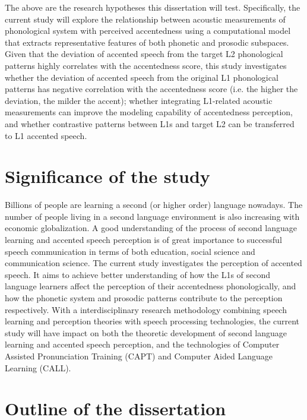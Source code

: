 The above are the research hypotheses this dissertation will test. Specifically, the current study will explore the relationship between acoustic measurements of phonological system with perceived accentedness using a computational model that extracts representative features of both phonetic and prosodic subspaces. Given that the deviation of accented speech from the target L2 phonological patterns highly correlates with the accentedness score, this study investigates whether the deviation of accented speech from the original L1 phonological patterns has negative correlation with the accentedness score (i.e. the higher the deviation, the milder the accent); whether integrating L1-related acoustic measurements can improve the modeling capability of accentedness perception, and whether contrastive patterns between L1s and target L2 can be transferred to L1 accented speech.

\section{Significance of the study}

Billions of people are learning a second (or higher order) language nowadays. The number of people living in a second language environment is also increasing with economic globalization. A good understanding of the process of second language learning and accented speech perception is of great importance to successful speech communication in terms of both education, social science and communication science. The current study investigates the perception of accented speech. It aims to achieve better understanding of how the L1s of second language learners affect the perception of their accentedness phonologically, and how the phonetic system and prosodic patterns contribute to the perception respectively. With a interdisciplinary research methodology combining speech learning and perception theories with speech processing technologies, the current study will have impact on both the theoretic development of second language learning and accented speech perception, and the technologies of Computer Assisted Pronunciation Training (CAPT) and Computer Aided Language Learning (CALL).

\section{Outline of the dissertation}

